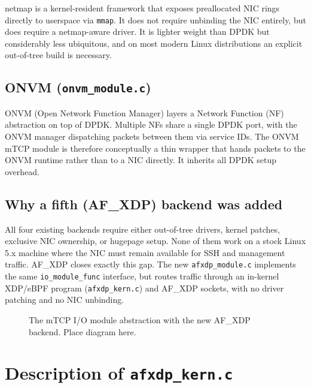 \documentclass[10pt, letterpaper, twocolumn]{article}
\begin{document}
netmap is a kernel-resident framework that exposes preallocated NIC rings directly to userspace via \texttt{mmap}. It does not require unbinding the NIC entirely, but does require a netmap-aware driver. It is lighter weight than DPDK but considerably less ubiquitous, and on most modern Linux distributions an explicit out-of-tree build is necessary.

\subsection{ONVM (\texttt{onvm\_module.c})}

ONVM (Open Network Function Manager) layers a Network Function (NF) abstraction on top of DPDK. Multiple NFs share a single DPDK port, with the ONVM manager dispatching packets between them via service IDs. The ONVM mTCP module is therefore conceptually a thin wrapper that hands packets to the ONVM runtime rather than to a NIC directly. It inherits all DPDK setup overhead.

\subsection{Why a fifth (AF\_XDP) backend was added}

All four existing backends require either out-of-tree drivers, kernel patches, exclusive NIC ownership, or hugepage setup. None of them work on a stock Linux 5.x machine where the NIC must remain available for SSH and management traffic. AF\_XDP closes exactly this gap. The new \texttt{afxdp\_module.c} implements the same \texttt{io\_module\_func} interface, but routes traffic through an in-kernel XDP/eBPF program (\texttt{afxdp\_kern.c}) and AF\_XDP sockets, with no driver patching and no NIC unbinding.

\begin{figure}[htbp]
    \centering
    \caption{The mTCP I/O module abstraction with the new AF\_XDP backend. Place diagram here.}
    \label{fig:io_modules}
\end{figure}
\FloatBarrier

\section{Description of \texttt{afxdp\_kern.c}}
\end{document}
